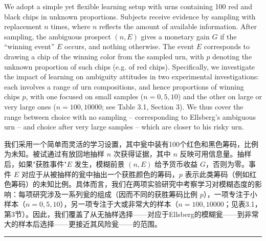 \documentclass[12pt,a4paper]{article}
\newenvironment{original}
  {\par\vspace{0.5em}\noindent\color{black}\ignorespaces}
  {\par\vspace{0.3em}}
\newenvironment{translation}
  {\par\noindent\color{transblue}\ignorespaces}
  {\par\vspace{0.8em}\hrule\vspace{0.5em}}
\begin{document}
\begin{original}
We adopt a simple yet flexible learning setup with urns containing 100 red and black chips in unknown proportions. Subjects receive evidence by sampling with replacement $n$ times, where $n$ reflects the amount of available information. After sampling, the ambiguous prospect $(n, E)$ gives a monetary gain $G$ if the ``winning event'' $E$ occurs, and nothing otherwise. The event $E$ corresponds to drawing a chip of the winning color from the sampled urn, with $p$ denoting the unknown proportion of such chips (e.g. of red chips). Specifically, we investigate the impact of learning on ambiguity attitudes in two experimental investigations: each involves a range of urn compositions, and hence proportions of winning chips $p$, with one focused on small samples ($n = 0, 5, 10$) and the other on large or very large ones ($n = 100, 10000$; see Table 3.1, Section 3). We thus cover the range between choice with no sampling -- corresponding to Ellsberg's ambiguous urn -- and choice after very large samples -- which are closer to his risky urn.
\end{original}

\begin{translation}
我们采用一个简单而灵活的学习设置，其中瓮中装有100个红色和黑色筹码，比例为未知。被试通过有放回地抽样 $n$ 次获得证据，其中 $n$ 反映可用信息量。抽样后，如果"获胜事件"$E$ 发生，模糊前景 $(n, E)$ 给予货币收益 $G$，否则为零。事件 $E$ 对应于从被抽样的瓮中抽出一个获胜颜色的筹码，$p$ 表示此类筹码（例如红色筹码）的未知比例。具体而言，我们在两项实验研究中考察学习对模糊态度的影响：每项研究涉及一系列瓮的组成（因而不同的获胜筹码比例 $p$），一项专注于小样本（$n = 0, 5, 10$），另一项专注于大或非常大的样本（$n = 100, 10000$；见表3.1，第3节）。因此，我们覆盖了从无抽样选择——对应于Ellsberg的模糊瓮——到非常大的样本后选择——更接近其风险瓮——的范围。
\end{translation}
\end{document}
